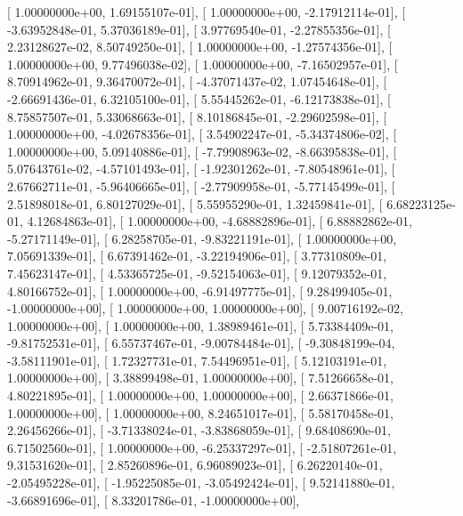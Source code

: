 \documentclass{article}
\begin{document}
       [  1.00000000e+00,   1.69155107e-01],
       [  1.00000000e+00,  -2.17912114e-01],
       [ -3.63952848e-01,   5.37036189e-01],
       [  3.97769540e-01,  -2.27855356e-01],
       [  2.23128627e-02,   8.50749250e-01],
       [  1.00000000e+00,  -1.27574356e-01],
       [  1.00000000e+00,   9.77496038e-02],
       [  1.00000000e+00,  -7.16502957e-01],
       [  8.70914962e-01,   9.36470072e-01],
       [ -4.37071437e-02,   1.07454648e-01],
       [ -2.66691436e-01,   6.32105100e-01],
       [  5.55445262e-01,  -6.12173838e-01],
       [  8.75857507e-01,   5.33068663e-01],
       [  8.10186845e-01,  -2.29602598e-01],
       [  1.00000000e+00,  -4.02678356e-01],
       [  3.54902247e-01,  -5.34374806e-02],
       [  1.00000000e+00,   5.09140886e-01],
       [ -7.79908963e-02,  -8.66395838e-01],
       [  5.07643761e-02,  -4.57101493e-01],
       [ -1.92301262e-01,  -7.80548961e-01],
       [  2.67662711e-01,  -5.96406665e-01],
       [ -2.77909958e-01,  -5.77145499e-01],
       [  2.51898018e-01,   6.80127029e-01],
       [  5.55955290e-01,   1.32459841e-01],
       [  6.68223125e-01,   4.12684863e-01],
       [  1.00000000e+00,  -4.68882896e-01],
       [  6.88882862e-01,  -5.27171149e-01],
       [  6.28258705e-01,  -9.83221191e-01],
       [  1.00000000e+00,   7.05691339e-01],
       [  6.67391462e-01,  -3.22194906e-01],
       [  3.77310809e-01,   7.45623147e-01],
       [  4.53365725e-01,  -9.52154063e-01],
       [  9.12079352e-01,   4.80166752e-01],
       [  1.00000000e+00,  -6.91497775e-01],
       [  9.28499405e-01,  -1.00000000e+00],
       [  1.00000000e+00,   1.00000000e+00],
       [  9.00716192e-02,   1.00000000e+00],
       [  1.00000000e+00,   1.38989461e-01],
       [  5.73384409e-01,  -9.81752531e-01],
       [  6.55737467e-01,  -9.00784484e-01],
       [ -9.30848199e-04,  -3.58111901e-01],
       [  1.72327731e-01,   7.54496951e-01],
       [  5.12103191e-01,   1.00000000e+00],
       [  3.38899498e-01,   1.00000000e+00],
       [  7.51266658e-01,   4.80221895e-01],
       [  1.00000000e+00,   1.00000000e+00],
       [  2.66371866e-01,   1.00000000e+00],
       [  1.00000000e+00,   8.24651017e-01],
       [  5.58170458e-01,   2.26456266e-01],
       [ -3.71338024e-01,  -3.83868059e-01],
       [  9.68408690e-01,   6.71502560e-01],
       [  1.00000000e+00,  -6.25337297e-01],
       [ -2.51807261e-01,   9.31531620e-01],
       [  2.85260896e-01,   6.96089023e-01],
       [  6.26220140e-01,  -2.05495228e-01],
       [ -1.95225085e-01,  -3.05492424e-01],
       [  9.52141880e-01,  -3.66891696e-01],
       [  8.33201786e-01,  -1.00000000e+00],
\end{document}
